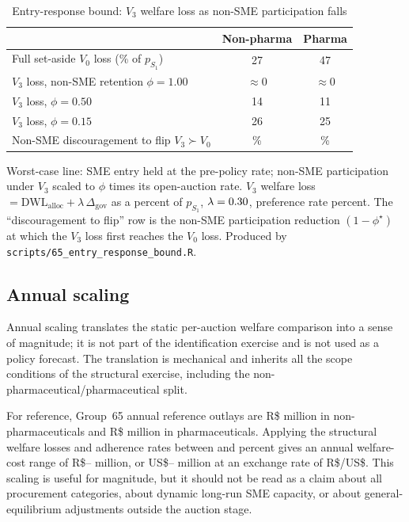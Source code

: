 \documentclass[12pt]{article}
\begin{document}
\begin{table}[!htbp]
\centering
\begin{threeparttable}
\caption{Entry-response bound: $V_3$ welfare loss as non-SME participation falls}
\label{oa:tab_entry_bound}
\small
\setlength{\tabcolsep}{6pt}
\begin{tabular}{lcc}
\toprule
 & Non-pharma & Pharma \\
\midrule
Full set-aside $V_0$ loss (\% of $p_{S_1}$) & 27 & 47 \\
\addlinespace
$V_3$ loss, non-SME retention $\phi=1.00$ & $\approx 0$ & $\approx 0$ \\
$V_3$ loss, $\phi=0.50$ & 14 & 11 \\
$V_3$ loss, $\phi=0.15$ & 26 & 25 \\
\addlinespace
Non-SME discouragement to flip $V_3\succ V_0$ & \entryFlipDiscNp{}\% & \entryFlipDiscPh{}\% \\
\bottomrule
\end{tabular}
\begin{tablenotes}\footnotesize
\item Worst-case line: SME entry held at the pre-policy rate; non-SME
participation under $V_3$ scaled to $\phi$ times its open-auction rate.
$V_3$ welfare loss $=\mathrm{DWL}_{\mathrm{alloc}}+\lambda\,\Delta_{\mathrm{gov}}$
as a percent of $p_{S_1}$, $\lambda=0.30$, preference rate
\prefMainPct{} percent. The ``discouragement to flip'' row is the non-SME
participation reduction $(1-\phi^\star)$ at which the $V_3$ loss first reaches
the $V_0$ loss. Produced by \texttt{scripts/65\_entry\_response\_bound.R}.
\end{tablenotes}
\end{threeparttable}
\end{table}

\subsection{Annual scaling}

Annual scaling translates the static per-auction welfare comparison into a
sense of magnitude; it is not part of the identification exercise and is
not used as a policy forecast. The translation is mechanical and inherits
all the scope conditions of the structural exercise, including the
non-pharmaceutical/pharmaceutical split.

For reference, Group~65 annual reference outlays are R\$\welfRefOutlayNpYr{}
million in non-pharmaceuticals and R\$\welfRefOutlayPharmaYr{} million in
pharmaceuticals. Applying the structural welfare losses and adherence rates
between \welfAdherenceLoPct{} and \welfAdherenceHiPct{} percent gives an
annual welfare-cost range of R\$\welfRangeLoBRL--\welfRangeHiBRL{} million,
or US\$\welfRangeLoUSD--\welfRangeHiUSD{} million at an exchange rate of
\fxRate{} R\$/US\$. This scaling is useful for magnitude, but it should
not be read as a claim about all procurement categories, about dynamic
long-run SME capacity, or about general-equilibrium adjustments outside
the auction stage.



\end{document}
